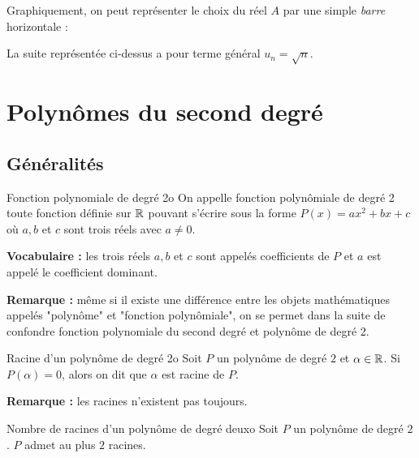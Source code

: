 Graphiquement, on peut représenter le choix du réel $A$ par une simple \textit{barre} horizontale :
\begin{center}
\end{center}
La suite représentée ci-dessus a pour terme général $u_n=\sqrt n$.

\newpage
\section[Polynômes du second degré]{Polynômes du second degré}

\subsection{Généralités}
\begin{definition}{Fonction polynomiale de degré 2}{o}
On appelle fonction polynômiale de degré 2 toute fonction définie sur $\mathbb{R}$ pouvant s'écrire sous la forme $P(x)=ax^2+bx+c$ où $a,b$ et $c$ sont trois réels avec $a\neq 0$.
\end{definition}
\textbf{Vocabulaire :} les trois réels $a,b$ et $c$ sont appelés coefficients de $P$ et $a$ est appelé le coefficient dominant. 


\textbf{Remarque : } même si il existe une différence entre les objets mathématiques appelés "polynôme" et "fonction polynômiale", on se permet dans la suite de confondre fonction polynomiale du second degré et polynôme de degré 2. 

\begin{definition}{Racine d'un polynôme de degré 2}{o}
	Soit $P$ un polynôme de degré $2$ et $\alpha\in\mathbb{R}$. Si $P(\alpha)=0$, alors on dit que $\alpha$ est racine de $P$.
\end{definition}
\textbf{Remarque : } les racines n'existent pas toujours. 
\begin{proposition}{Nombre de racines d'un polynôme de degré deux}{o}
	Soit $P$ un polynôme de degré $2$. $P$ admet au plus $2$ racines.
\end{proposition}

